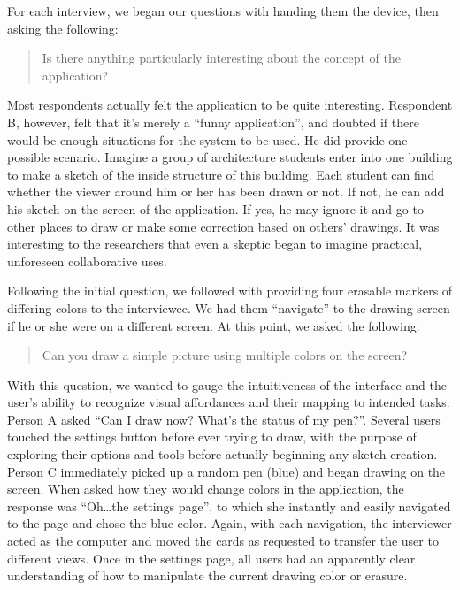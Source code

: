 \documentclass{chi2009}
\begin{document}
For each interview, we began our questions with handing them the device, then
asking the following:

\begin{quote}
Is there anything particularly interesting about the concept of the
application?
\end{quote}

Most respondents actually felt the application to be quite interesting.
Respondent B, however, felt that it's merely a ``funny application'', and
doubted if there would be enough situations for the system to be used.   He did
provide one possible  scenario. Imagine a group of architecture students enter
into one building to make a sketch of the inside structure of this building.
Each student can find whether the viewer around him or her has been drawn or
not. If not, he can add his sketch on the screen of the application.  If yes,
he may ignore it and go to other places to draw or make some correction based
on others' drawings.  It was interesting to the researchers that even a skeptic
began to imagine practical, unforeseen collaborative uses.

Following the initial question, we followed with providing four erasable
markers of differing colors to the interviewee.  We had them ``navigate'' to
the drawing screen if he or she were on a different screen.  At this point, we
asked the following:
\begin{quote}
Can you draw a simple picture using multiple colors on the screen?
\end{quote}

With this question, we wanted to gauge the intuitiveness of the interface and
the user's ability to recognize visual affordances and their mapping to
intended tasks.  Person A asked ``Can I draw now?  What's the status of my
pen?''.  Several users touched the settings button before ever trying to draw,
with the purpose of exploring their options and tools before actually beginning
any sketch creation.  Person C immediately picked up a random pen (blue) and
began drawing on the screen.  When asked how they would change colors in the
application, the response was ``Oh\ldots  the settings page'', to which she
instantly and easily navigated to the page and chose the blue color.  Again,
with each navigation, the interviewer acted as the computer and moved the cards
as requested to transfer the user to different views.  Once in the settings
page, all users had an apparently clear understanding of how to manipulate the
current drawing color or erasure.
\end{document}
